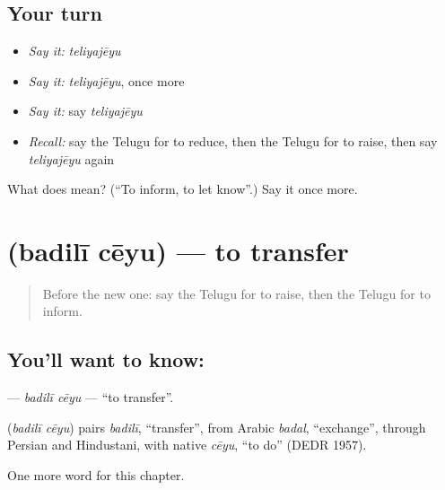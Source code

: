 \subsection*{Your turn}
\begin{itemize}
\raggedright
  \item \emph{Say it:} \emph{teliyajēyu}
  \item \emph{Say it:} \emph{teliyajēyu}, once more
  \item \emph{Say it:} say \emph{teliyajēyu}
  \item \emph{Recall:} say the Telugu for to reduce, then the Telugu for to raise, then say \emph{teliyajēyu} again
\end{itemize}

\begin{tcolorbox}[breakable,colback=teal!4,colframe=teal!35!black,title={Before you move on}]
What does  mean? (\textquotedblleft{}To inform, to let know\textquotedblright{}.) Say it once more.
\end{tcolorbox}
\section[\texorpdfstring{\te{బదిలీ} \te{చేయు} (badilī cēyu)}{బదిలీ చేయు (badilī cēyu)}]{  (badilī cēyu) — to transfer}

\label{lesson:TE-C243-badili-ceyu}



\begin{quote}
Before the new one: say the Telugu for to raise, then the Telugu for to inform.
\end{quote}

\subsection*{You'll want to know:  }
\textbf{ } — \emph{badilī cēyu} — \textquotedblleft{}to transfer\textquotedblright{}.

\begin{cousinweb}
\textbf{ } (\emph{badilī cēyu}) pairs \emph{badilī}, \textquotedblleft{}transfer\textquotedblright{}, from Arabic \emph{badal}, \textquotedblleft{}exchange\textquotedblright{}, through Persian and Hindustani, with native \emph{cēyu}, \textquotedblleft{}to do\textquotedblright{} (DEDR 1957).
\end{cousinweb}

\begin{grammarlens}[title={What you've built}]
One more word for this chapter.
\end{grammarlens}

